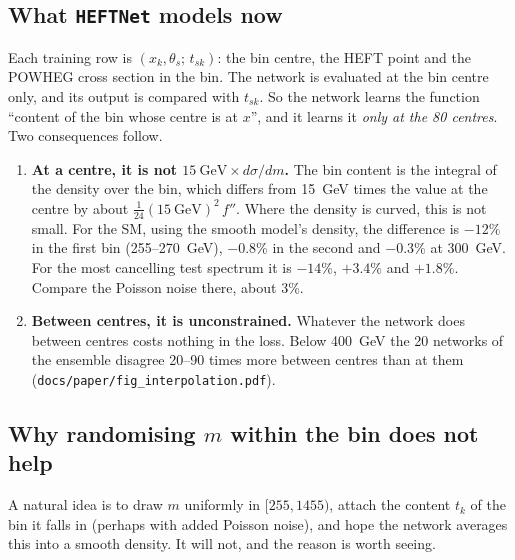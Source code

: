 \documentclass[11pt]{article}
\newcommand{\file}[1]{\nolinkurl{#1}}
\newcommand{\code}[1]{\texttt{#1}}
\begin{document}
\subsection{What \code{HEFTNet} models now}

Each training row is $(x_k, \theta_s;\, t_{sk})$: the bin centre, the HEFT point and the POWHEG
cross section in the bin. The network is evaluated at the bin centre only, and its output is
compared with $t_{sk}$. So the network learns the function ``content of the bin whose centre is
at $x$'', and it learns it \emph{only at the 80 centres}. Two consequences follow.

\begin{enumerate}
  \item \textbf{At a centre, it is not $15~\text{GeV}\times d\sigma/dm$.} The bin content is the
    integral of the density over the bin, which differs from 15~GeV times the value at the
    centre by about $\tfrac{1}{24}(15~\text{GeV})^2\,f''$. Where the density is curved, this is
    not small. For the SM, using the smooth model's density, the difference is $-12\%$ in the
    first bin (255--270~GeV), $-0.8\%$ in the second and $-0.3\%$ at 300~GeV. For the most
    cancelling test spectrum it is $-14\%$, $+3.4\%$ and $+1.8\%$. Compare the Poisson noise
    there, about 3\%.
  \item \textbf{Between centres, it is unconstrained.} Whatever the network does between centres
    costs nothing in the loss. Below 400~GeV the 20 networks of the ensemble disagree 20--90
    times more between centres than at them (\file{docs/paper/fig_interpolation.pdf}).
\end{enumerate}

\subsection{Why randomising $m$ within the bin does not help}

A natural idea is to draw $m$ uniformly in $[255, 1455)$, attach the content $t_k$ of the bin it
falls in (perhaps with added Poisson noise), and hope the network averages this into a smooth
density. It will not, and the reason is worth seeing.
\end{document}
